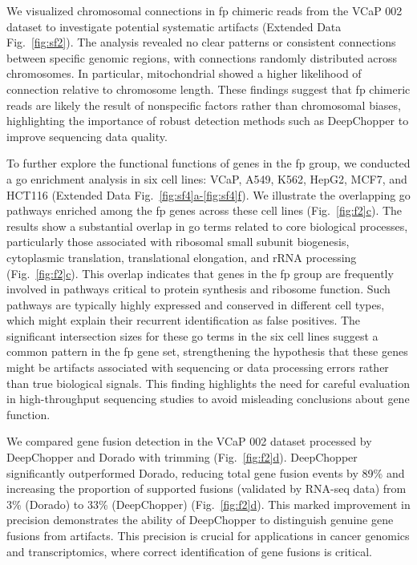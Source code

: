 \documentclass[pdflatex, sn-mathphys-num, lineno]{sn-jnl}%
\newcommand{\figref}[2]{Fig.~\hyperref[#1]{\ref*{#1}#2}}
\newcommand{\edfigref}[2]{Extended Data Fig.~\hyperref[#1]{\ref*{#1}#2}}
\newcommand{\edfigrefrg}[3]{Extended Data Fig.~\hyperref[#1]{\ref*{#1}#2-\ref*{#1}#3}}
\theoremstyle{thmstyleone}%
\theoremstyle{thmstyletwo}%
\theoremstyle{thmstylethree}%
\begin{document}
We visualized chromosomal connections in \gls{fp} chimeric reads from the VCaP 002 dataset to investigate potential systematic artifacts (\edfigref{fig:sf2}{}).
The analysis revealed no clear patterns or consistent connections between specific genomic regions, with connections randomly distributed across chromosomes.
In particular, mitochondrial showed a higher likelihood of connection relative to chromosome length.
These findings suggest that \gls{fp} chimeric reads are likely the result of nonspecific factors rather than chromosomal biases, highlighting the importance of robust detection methods such as DeepChopper to improve sequencing data quality.

To further explore the functional functions of genes in the \gls{fp} group, we conducted a \gls{go} enrichment analysis in six cell lines: VCaP, A549, K562, HepG2, MCF7, and HCT116 (\edfigrefrg{fig:sf4}{a}{f}).
We illustrate the overlapping \gls{go} pathways enriched among the \gls{fp} genes across these cell lines (\figref{fig:f2}{c}).
The results show a substantial overlap in \gls{go} terms related to core biological processes, particularly those associated with ribosomal small subunit biogenesis, cytoplasmic translation, translational elongation, and rRNA processing (\figref{fig:f2}{c}).
This overlap indicates that genes in the \gls{fp} group are frequently involved in pathways critical to protein synthesis and ribosome function.
Such pathways are typically highly expressed and conserved in different cell types, which might explain their recurrent identification as false positives.
The significant intersection sizes for these \gls{go} terms in the six cell lines suggest a common pattern in the \gls{fp} gene set, strengthening the hypothesis that these genes might be artifacts associated with sequencing or data processing errors rather than true biological signals.
This finding highlights the need for careful evaluation in high-throughput sequencing studies to avoid misleading conclusions about gene function.

We compared gene fusion detection in the VCaP 002 dataset processed by DeepChopper and Dorado with trimming (\figref{fig:f2}{d}).
DeepChopper significantly outperformed Dorado, reducing total gene fusion events by 89\% and increasing the proportion of supported fusions (validated by RNA-seq data) from 3\% (Dorado) to 33\% (DeepChopper)  (\figref{fig:f2}{d}).
This marked improvement in precision demonstrates the ability of DeepChopper to distinguish genuine gene fusions from artifacts.
This precision is crucial for applications in cancer genomics and transcriptomics, where correct identification of gene fusions is critical.
\end{document}

